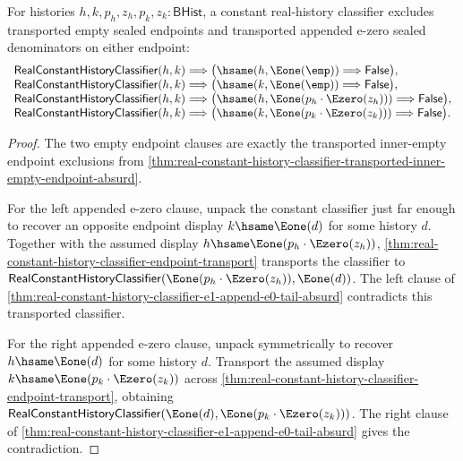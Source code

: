 \begin{theorem}
\label{thm:real-constant-history-classifier-transported-malformed-inner-denominator-absurd}
For histories $h,k,p_h,z_h,p_k,z_k:\mathsf{BHist}$, a constant real-history
classifier excludes transported empty sealed endpoints and transported
appended e-zero sealed denominators on either endpoint:
$$
\begin{array}{l}
\mathsf{RealConstantHistoryClassifier}(h,k)
\Longrightarrow
\bigl(\hsame(h,\Eone(\emp))\Longrightarrow\mathsf{False}\bigr),\\
\mathsf{RealConstantHistoryClassifier}(h,k)
\Longrightarrow
\bigl(\hsame(k,\Eone(\emp))\Longrightarrow\mathsf{False}\bigr),\\
\mathsf{RealConstantHistoryClassifier}(h,k)
\Longrightarrow
\bigl(\hsame(h,\Eone(p_h\cdot\Ezero(z_h)))\Longrightarrow\mathsf{False}\bigr),\\
\mathsf{RealConstantHistoryClassifier}(h,k)
\Longrightarrow
\bigl(\hsame(k,\Eone(p_k\cdot\Ezero(z_k)))\Longrightarrow\mathsf{False}\bigr).
\end{array}
$$
\end{theorem}
\begin{proof}
The two empty endpoint clauses are exactly the transported inner-empty endpoint
exclusions from
\autoref{thm:real-constant-history-classifier-transported-inner-empty-endpoint-absurd}.

For the left appended e-zero clause, unpack the constant classifier just far
enough to recover an opposite endpoint display $k\hsame\Eone(d)$ for some
history $d$. Together with the assumed display
$h\hsame\Eone(p_h\cdot\Ezero(z_h))$,
\autoref{thm:real-constant-history-classifier-endpoint-transport} transports
the classifier to
$\mathsf{RealConstantHistoryClassifier}(\Eone(p_h\cdot\Ezero(z_h)),\Eone(d))$.
The left clause of
\autoref{thm:real-constant-history-classifier-e1-append-e0-tail-absurd}
contradicts this transported classifier.

For the right appended e-zero clause, unpack symmetrically to recover
$h\hsame\Eone(d)$ for some history $d$. Transport the assumed display
$k\hsame\Eone(p_k\cdot\Ezero(z_k))$ across
\autoref{thm:real-constant-history-classifier-endpoint-transport}, obtaining
$\mathsf{RealConstantHistoryClassifier}(\Eone(d),\Eone(p_k\cdot\Ezero(z_k)))$.
The right clause of
\autoref{thm:real-constant-history-classifier-e1-append-e0-tail-absurd}
gives the contradiction.
\end{proof}


